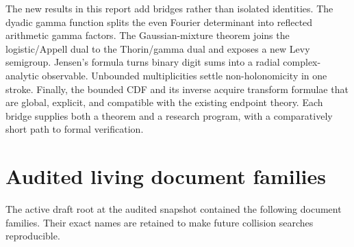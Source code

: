 \documentclass[11pt]{article}
\theoremstyle{definition}
\theoremstyle{remark}
\begin{document}
The new results in this report add bridges rather than isolated identities.  The dyadic gamma
function splits the even Fourier determinant into reflected arithmetic gamma factors.  The
Gaussian-mixture theorem joins the logistic/Appell dual to the Thorin/gamma dual and exposes a
new Levy semigroup.  Jensen's formula turns binary digit sums into a radial complex-analytic
observable.  Unbounded multiplicities settle non-holonomicity in one stroke.  Finally, the
bounded CDF and its inverse acquire transform formulae that are global, explicit, and
compatible with the existing endpoint theory.  Each bridge supplies both a theorem and a
research program, with a comparatively short path to formal verification.

\appendix

\section{Audited living document families}
\label{p2:app:sources}

The active draft root at the audited snapshot contained the following document families.
Their exact names are retained to make future collision searches reproducible.
\end{document}
